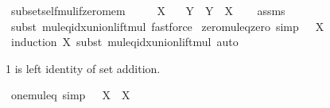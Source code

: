 \begin{isabellebody}
{\isafoldproof}%
%
\isadelimproof
\isanewline
%
\endisadelimproof
\isanewline
{}\isamarkupfalse%
\ subset{\isacharunderscore}{\kern0pt}self{\isacharunderscore}{\kern0pt}mul{\isacharunderscore}{\kern0pt}if{\isacharunderscore}{\kern0pt}zero{\isacharunderscore}{\kern0pt}mem{\isacharcolon}{\kern0pt}\isanewline
\ \ \ {\isachardoublequoteopen}{}\ {\isasymin}\ X{\isachardoublequoteclose}\isanewline
\ \ \ {\isachardoublequoteopen}Y\ {\isasymsubseteq}\ Y\ {\isacharasterisk}{\kern0pt}\ X{\isachardoublequoteclose}\isanewline
%
\isadelimproof
\ \ %
\endisadelimproof
%
\isatagproof
{}\isamarkupfalse%
\ assms\ \isamarkupfalse%
\ {\isacharparenleft}{\kern0pt}subst\ mul{\isacharunderscore}{\kern0pt}eq{\isacharunderscore}{\kern0pt}idx{\isacharunderscore}{\kern0pt}union{\isacharunderscore}{\kern0pt}lift{\isacharunderscore}{\kern0pt}mul{\isacharparenright}{\kern0pt}\ fastforce%
\endisatagproof
{\isafoldproof}%
%
\isadelimproof
%
\endisadelimproof
%
\isadelimdocument
%
\endisadelimdocument
%
\isatagdocument
%
\isamarkuptrue%
%
\endisatagdocument
{\isafolddocument}%
%
\isadelimdocument
%
\endisadelimdocument
{}\isamarkupfalse%
\ zero{\isacharunderscore}{\kern0pt}mul{\isacharunderscore}{\kern0pt}eq{\isacharunderscore}{\kern0pt}zero\ {\isacharbrackleft}{\kern0pt}simp{\isacharbrackright}{\kern0pt}{\isacharcolon}{\kern0pt}\ {\isachardoublequoteopen}{}\ {\isacharasterisk}{\kern0pt}\ X\ {\isacharequal}{\kern0pt}\ {}{\isachardoublequoteclose}\isanewline
%
\isadelimproof
\ \ %
\endisadelimproof
%
\isatagproof
{}\isamarkupfalse%
\ {\isacharparenleft}{\kern0pt}induction\ X{\isacharcomma}{\kern0pt}\ subst\ mul{\isacharunderscore}{\kern0pt}eq{\isacharunderscore}{\kern0pt}idx{\isacharunderscore}{\kern0pt}union{\isacharunderscore}{\kern0pt}lift{\isacharunderscore}{\kern0pt}mul{\isacharparenright}{\kern0pt}\ auto%
\endisatagproof
{\isafoldproof}%
%
\isadelimproof
%
\endisadelimproof
%
\begin{isamarkuptext}%
1 is left identity of set addition.%
\end{isamarkuptext}\isamarkuptrue%
\isamarkupfalse%
\ one{\isacharunderscore}{\kern0pt}mul{\isacharunderscore}{\kern0pt}eq\ {\isacharbrackleft}{\kern0pt}simp{\isacharbrackright}{\kern0pt}{\isacharcolon}{\kern0pt}\ {\isachardoublequoteopen}{}\ {\isacharasterisk}{\kern0pt}\ X\ {\isacharequal}{\kern0pt}\ X{\isachardoublequoteclose}\isanewline

\end{isabellebody}
